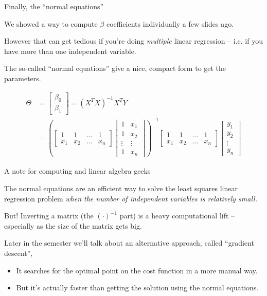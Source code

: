 \documentclass[aspectratio=169]{beamer}
\begin{document}
\begin{frame}{Finally, the ``normal equations''}

We showed a  way to compute $\beta$ coefficients individually a few slides ago.

\vspace{5mm}\pause

However that can get tedious if you're doing \textit{multiple} linear regression -- i.e. if you have more than one independent variable.  

\vspace{5mm}

The so-called ``normal equations'' give a nice, compact form to get the parameters.

\begin{align*}
\Theta &= 
\begin{bmatrix}
	\beta_0\\
	\beta_1
\end{bmatrix}
= 
(X^TX)^{-1}X^TY\\
&= 
\left(
\begin{bmatrix} 
  1 & 1&\ldots & 1\\
  x_1& x_2 &\ldots & x_n
\end{bmatrix} 
\begin{bmatrix} 
  1 & x_1\\
  1 & x_2\\
  \vdots & \vdots \\
  1 & x_n 
\end{bmatrix} \right)^{-1}
\begin{bmatrix} 
  1 & 1&\ldots & 1\\
  x_1& x_2 &\ldots & x_n
\end{bmatrix} 
\begin{bmatrix} 
  y_1\\
  y_2\\
   \vdots \\
  y_n 
\end{bmatrix} 
\end{align*}
\end{frame}

\begin{frame}{A note for computing and linear algebra geeks}

The normal equations are an efficient way to solve the least squares linear regression problem \textit{when the number of independent variables is relatively small.}

\vspace{5mm}

But!  Inverting a matrix (the $(\cdot)^{-1}$ part) is a heavy computational lift -- especially as the size of the matrix gets big. 


\vspace{5mm}

Later in the semester we'll talk about an alternative approach, called ``gradient descent'', 
\begin{itemize}
\item  It searches for the optimal point on the cost function in a more manual way. 
\item But it's actually faster than getting the solution using the normal equations.
\end{itemize}
\end{frame}
\end{document}

